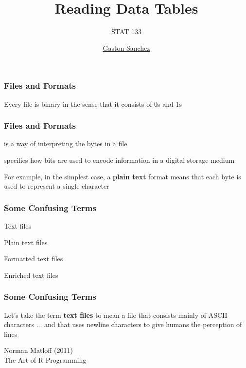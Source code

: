 \documentclass[12pt]{beamer}\usepackage[]{graphicx}\usepackage[]{color}
\title{Reading Data Tables}
\subtitle{STAT 133}
\author{\href{http://www.gastonsanchez.com}{Gaston Sanchez}}
\institute{\href{https://github.com/ucb-stat133/stat133-fall-2016}{\tt \scriptsize \color{foreground} github.com/ucb-stat133/stat133-fall-2016}}
\date{}
\begin{document}
{
  \frame{
    \titlepage
  } 
}



\begin{frame}
\frametitle{Files and Formats}

\begin{center}
\end{center}
Every file is binary in the sense that it consists of 0s and 1s

\end{frame}


\begin{frame}
\frametitle{Files and Formats}

\bbi
  \item is a way of interpreting the bytes in a file
  \item specifies how bits are used to encode information in a digital storage medium
  \item For example, in the simplest case, a \textbf{plain text} format means that each byte is used to represent a single character
\ei
\eb

\end{frame}


\begin{frame}
\frametitle{Some Confusing Terms}

\bbi
  \item Text files
  \item Plain text files
  \item Formatted text files
  \item Enriched text files
\ei

\end{frame}


\begin{frame}
\frametitle{Some Confusing Terms}

Let's take the term \textbf{text files} to mean a file that consists mainly of ASCII characters ... and that uses newline characters to give humans the perception of lines

\bigskip
{\footnotesize
Norman Matloff (2011) \\
{\mdlit The Art of R Programming}
}

\end{frame}
\end{document}
